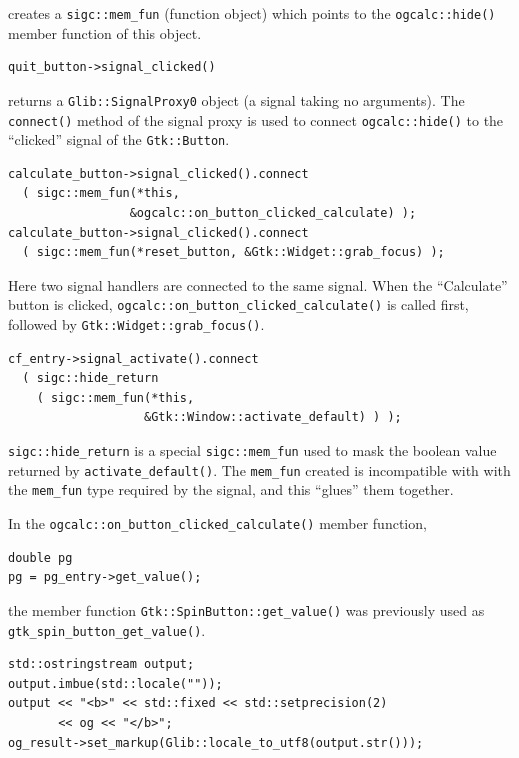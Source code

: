 \documentclass[a4paper,oneside]{article}
\newcommand{\class}[1]{\texttt{#1}}
\newcommand{\function}[1]{\texttt{#1()}}
\begin{document}
\noindent creates a \class{sigc::mem\_fun} (function object) which points
to the \function{ogcalc::hide} member function of this object.

\begin{lstlisting}[numbers=none, language={[GNU]C++}]
quit_button->signal_clicked()
\end{lstlisting}

\noindent returns a \class{Glib::SignalProxy0} object (a signal taking no
arguments).  The \function{connect} method of the signal proxy is used
to connect \function{ogcalc::hide} to the ``clicked'' signal of the
\class{Gtk::Button}.

\begin{lstlisting}[numbers=none, language={[GNU]C++}]
calculate_button->signal_clicked().connect
  ( sigc::mem_fun(*this,
                 &ogcalc::on_button_clicked_calculate) );
calculate_button->signal_clicked().connect
  ( sigc::mem_fun(*reset_button, &Gtk::Widget::grab_focus) );
\end{lstlisting}

Here two signal handlers are connected to the same signal.  When the
``Calculate'' button is clicked,
\function{ogcalc::on\_button\_clicked\_calculate} is called first,
followed by \function{Gtk::Widget::grab\_focus}.

\begin{lstlisting}[numbers=none, language={[GNU]C++}]
cf_entry->signal_activate().connect
  ( sigc::hide_return
    ( sigc::mem_fun(*this,
                   &Gtk::Window::activate_default) ) );
\end{lstlisting}

\class{sigc::hide\_return} is a special \class{sigc::mem\_fun} used to
mask the boolean value returned by \function{activate\_default}.  The
\class{mem\_fun} created is incompatible with with the
\class{mem\_fun} type required by the signal, and this ``glues'' them
together.

In the \function{ogcalc::on\_button\_clicked\_calculate} member
function,

\begin{lstlisting}[numbers=none, language={[GNU]C++}]
double pg
pg = pg_entry->get_value();
\end{lstlisting}

\noindent the member function \function{Gtk::SpinButton::get\_value}
was previously used as \function{gtk\_spin\_button\_get\_value}.

\begin{lstlisting}[numbers=none, language={[GNU]C++}]
std::ostringstream output;
output.imbue(std::locale(""));
output << "<b>" << std::fixed << std::setprecision(2)
       << og << "</b>";
og_result->set_markup(Glib::locale_to_utf8(output.str()));
\end{lstlisting}
\end{document}
